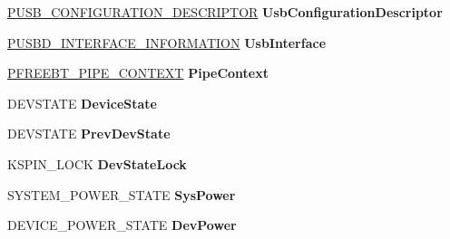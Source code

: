 \begin{DoxyCompactItemize}
\hyperlink{struct___u_s_b___c_o_n_f_i_g_u_r_a_t_i_o_n___d_e_s_c_r_i_p_t_o_r}{P\+U\+S\+B\+\_\+\+C\+O\+N\+F\+I\+G\+U\+R\+A\+T\+I\+O\+N\+\_\+\+D\+E\+S\+C\+R\+I\+P\+T\+OR} {\bfseries Usb\+Configuration\+Descriptor}
\item 
\mbox{\label{struct___d_e_v_i_c_e___e_x_t_e_n_s_i_o_n_a13034d336b22e4c66d3062b24fb9a87d}} 
\hyperlink{struct___u_s_b_d___i_n_t_e_r_f_a_c_e___i_n_f_o_r_m_a_t_i_o_n}{P\+U\+S\+B\+D\+\_\+\+I\+N\+T\+E\+R\+F\+A\+C\+E\+\_\+\+I\+N\+F\+O\+R\+M\+A\+T\+I\+ON} {\bfseries Usb\+Interface}
\item 
\mbox{\label{struct___d_e_v_i_c_e___e_x_t_e_n_s_i_o_n_ab66b9b34db3787ecf7bc71aa098423d2}} 
\hyperlink{struct___f_r_e_e_b_t___p_i_p_e___c_o_n_t_e_x_t}{P\+F\+R\+E\+E\+B\+T\+\_\+\+P\+I\+P\+E\+\_\+\+C\+O\+N\+T\+E\+XT} {\bfseries Pipe\+Context}
\item 
\mbox{\label{struct___d_e_v_i_c_e___e_x_t_e_n_s_i_o_n_ac5d6e6ecf97e4f681bf3183286bf3ded}} 
D\+E\+V\+S\+T\+A\+TE {\bfseries Device\+State}
\item 
\mbox{\label{struct___d_e_v_i_c_e___e_x_t_e_n_s_i_o_n_afc23b2d527158dd8fac77b3f94331ec0}} 
D\+E\+V\+S\+T\+A\+TE {\bfseries Prev\+Dev\+State}
\item 
\mbox{\label{struct___d_e_v_i_c_e___e_x_t_e_n_s_i_o_n_a3d4a92d32c2c94cac6fcf0d87f028662}} 
K\+S\+P\+I\+N\+\_\+\+L\+O\+CK {\bfseries Dev\+State\+Lock}
\item 
\mbox{\label{struct___d_e_v_i_c_e___e_x_t_e_n_s_i_o_n_a5a32f1278f3279bebeb5f505ef6909e8}} 
S\+Y\+S\+T\+E\+M\+\_\+\+P\+O\+W\+E\+R\+\_\+\+S\+T\+A\+TE {\bfseries Sys\+Power}
\item 
\mbox{\label{struct___d_e_v_i_c_e___e_x_t_e_n_s_i_o_n_a21ee16116bca782f2ceeedb4110e4e10}} 
D\+E\+V\+I\+C\+E\+\_\+\+P\+O\+W\+E\+R\+\_\+\+S\+T\+A\+TE {\bfseries Dev\+Power}
\item 
\mbox{\label{struct___d_e_v_i_c_e___e_x_t_e_n_s_i_o_n_aa972d7ee024b16f38a0898b1c305aaad}} 

\end{DoxyCompactItemize}
